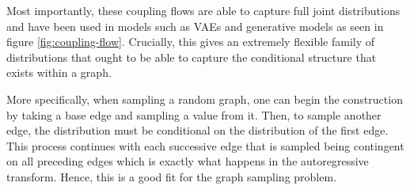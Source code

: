 Most importantly, these coupling flows are able to capture full joint distributions and have been used in models such as VAEs and generative models \cite{kobyzev_normalizing_2021} as seen in figure \ref{fig:coupling-flow}. Crucially, this gives an extremely flexible family of distributions that ought to be able to capture the conditional structure that exists within a graph.

More specifically, when sampling a random graph, one can begin the construction by taking a base edge and sampling a value from it. Then, to sample another edge, the distribution must be conditional on the distribution of the first edge. This process continues with each successive edge that is sampled being contingent on all preceding edges which is exactly what happens in the autoregressive transform. Hence, this is a good fit for the graph sampling problem.

